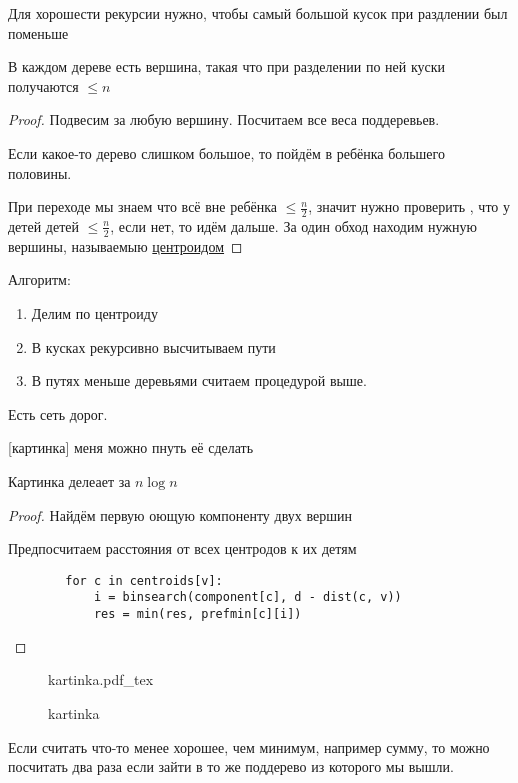 \documentclass{book}
\theoremstyle{definition}
\newcommand{\incfig}[1]{%
    \def\svgwidth{\columnwidth}
    {#1.pdf_tex}
}
\begin{document}
Для хорошести рекурсии нужно, чтобы самый большой кусок при раздлении был поменьше

\begin{lemma}
    В каждом дереве есть вершина, такая что при разделении по ней куски получаются $\leqslant n$
\end{lemma}
\begin{proof}
    Подвесим за любую вершину. Посчитаем все веса поддеревьев.

    Если какое-то дерево слишком большое, то пойдём в ребёнка большего половины.

    При переходе мы знаем что всё вне ребёнка $\leqslant  \frac{n}{2}$, значит нужно проверить , что у детей детей $\leqslant \frac{n}{2}$, если нет, то идём дальше. За один обход находим нужную вершины, называемыю \underline{центроидом}
\end{proof}

Алгоритм:
\begin{enumerate}
    \item Делим по центроиду
    \item В кусках рекурсивно высчитываем пути
    \item В путях меньше деревьями считаем процедурой выше.
\end{enumerate}

\begin{problem}
    Есть сеть дорог. 

    [картинка] меня можно пнуть её сделать

    Картинка делеает за $n\log n$
\end{problem}
\begin{proof}
    Найдём первую оющую компоненту двух вершин

    Предпосчитаем расстояния от всех центродов к их детям

    \begin{lstlisting}
        for c in centroids[v]:
            i = binsearch(component[c], d - dist(c, v))
            res = min(res, prefmin[c][i])
    \end{lstlisting}
\end{proof}

\begin{figure}[!ht]
    \centering
    \incfig{kartinka}
    \caption{kartinka}
    \label{fig:kartinka}
\end{figure}

Если считать что-то менее хорошее, чем минимум, например сумму, то можно посчитать два раза если зайти в то же поддерево из которого мы вышли.
\end{document}
